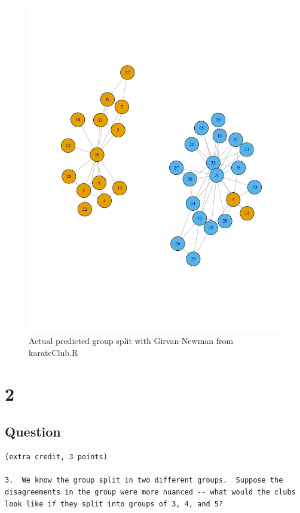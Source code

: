 \documentclass[letterpaper,11pt]{article}
\begin{document}
\begin{figure}[h]
\centering
\includegraphics[scale=0.6]{predictedSplit2.pdf}
\caption{Actual predicted group split with Girvan-Newman from karateClub.R}
\label{fig:q1outcome}
\end{figure}

\clearpage


\section*{2}

\subsection*{Question}

\begin{verbatim}
(extra credit, 3 points)

3.  We know the group split in two different groups.  Suppose the
disagreements in the group were more nuanced -- what would the clubs
look like if they split into groups of 3, 4, and 5?
\end{verbatim}
\end{document}
